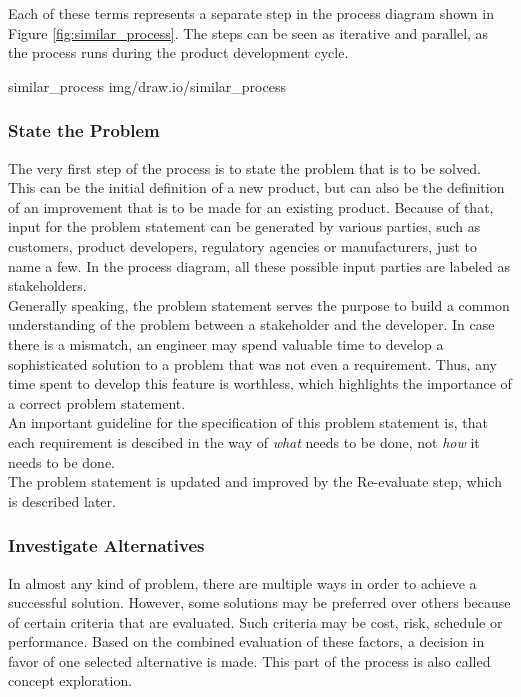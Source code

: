 Each of these terms represents a separate step in the process diagram shown in Figure \ref{fig:similar_process}.
The steps can be seen as iterative and parallel, as the process runs during the product development cycle.

 {similar_process} {img/draw.io/similar_process}

\subsubsection{State the Problem}

The very first step of the process is to state the problem that is to be solved.
This can be the initial definition of a new product, but can also be the definition of an improvement that is to be made for an existing product.
Because of that, input for the problem statement can be generated by various parties, such as customers, product developers, regulatory agencies or manufacturers, just to name a few.
In the process diagram, all these possible input parties are labeled as stakeholders.\\

Generally speaking, the problem statement serves the purpose to build a common understanding of the problem between a stakeholder and the developer.
In case there is a mismatch, an engineer may spend valuable time to develop a sophisticated solution to a problem that was not even a requirement.
Thus, any time spent to develop this feature is worthless, which highlights the importance of a correct problem statement.\\

An important guideline for the specification of this problem statement is, that each requirement is descibed in the way of \textit{what} needs to be done, not \textit{how} it needs to be done.\\

The problem statement is updated and improved by the Re-evaluate step, which is described later.

\subsubsection{Investigate Alternatives}

In almost any kind of problem, there are multiple ways in order to achieve a successful solution.
However, some solutions may be preferred over others because of certain criteria that are evaluated.
Such criteria may be cost, risk, schedule or performance.
Based on the combined evaluation of these factors, a decision in favor of one selected alternative is made.
This part of the process is also called concept exploration.\\

